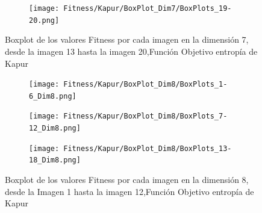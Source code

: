\documentclass[conference]{IEEEtran}
\begin{document}
\begin{figure}
    \centering
    \begin{subfigure}{0.5\textwidth}
        \texttt{[image: Fitness/Kapur/BoxPlot\_Dim7/BoxPlots\_19-20.png]}
        \vspace{-150pt} %
    \end{subfigure}
    \caption{Boxplot de los valores Fitness por cada imagen en la dimensión 7, desde la imagen 13 hasta la imagen 20,Función Objetivo entropía de Kapur}
    \label{fig:imagenes}    
\end{figure}

\begin{figure}
    \centering

    \begin{subfigure}{0.5\textwidth}
        \texttt{[image: Fitness/Kapur/BoxPlot\_Dim8/BoxPlots\_1-6\_Dim8.png]}
    \end{subfigure}
    
    \begin{subfigure}{0.5\textwidth}
        \texttt{[image: Fitness/Kapur/BoxPlot\_Dim8/BoxPlots\_7-12\_Dim8.png]}
    \end{subfigure}
         \begin{subfigure}{0.5\textwidth}
        \texttt{[image: Fitness/Kapur/BoxPlot\_Dim8/BoxPlots\_13-18\_Dim8.png]}
    \end{subfigure}
    \caption{Boxplot de los valores Fitness por cada imagen en la dimensión 8, desde la Imagen 1 hasta la imagen 12,Función Objetivo entropía de Kapur}
\label{fig:imagenes}    
\end{figure}
\end{document}
